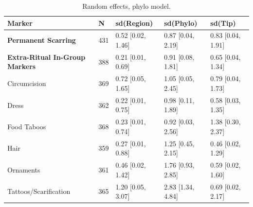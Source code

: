 \begin{table}[!ht]
\centering
\small
\caption{Random effects, phylo model.}
\label{tab:ext_random_effects_phylo}
\begin{tabular}{lllll}
\toprule
Marker & N & sd(Region) & sd(Phylo) & sd(Tip) \\
\midrule
\textbf{Permanent Scarring} & 431 & 0.52 [0.02, 1.46] & 0.87 [0.04, 2.19] & 0.83 [0.04, 1.91] \\
\textbf{Extra-Ritual In-Group Markers} & 388 & 0.21 [0.01, 0.69] & 0.91 [0.08, 1.81] & 0.65 [0.04, 1.34] \\
\midrule
Circumcision & 369 & 0.72 [0.05, 1.65] & 1.05 [0.05, 2.45] & 0.79 [0.04, 1.73] \\
Dress & 362 & 0.22 [0.01, 0.75] & 0.98 [0.11, 1.89] & 0.58 [0.03, 1.35] \\
Food Taboos & 368 & 0.23 [0.01, 0.74] & 0.92 [0.03, 2.56] & 1.38 [0.30, 2.37] \\
Hair & 359 & 0.27 [0.01, 0.88] & 1.25 [0.45, 2.15] & 0.46 [0.02, 1.29] \\
Ornaments & 361 & 0.46 [0.02, 1.42] & 1.76 [0.93, 2.85] & 0.59 [0.02, 1.60] \\
Tattoos/Scarification & 365 & 1.20 [0.05, 3.07] & 2.83 [1.34, 4.84] & 0.69 [0.02, 2.17] \\
\bottomrule
\end{tabular}
\end{table}